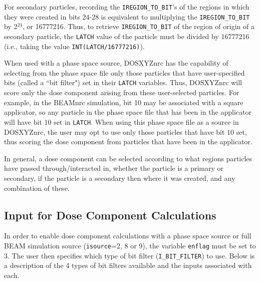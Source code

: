 \documentclass[12pt,twoside]{article}      %
\newcommand{\indexm}[1]{\index{#1}}
\begin{document}
For secondary particles, recording the {\tt IREGION\_TO\_BIT}'s of
the regions in which they were
created in bits 24-28 is equivalent to multiplying the {\tt IREGION\_TO\_BIT} by
2$^{24}$, or 16777216.  Thus, to retrieve {\tt IREGION\_TO\_BIT} of the region
of origin of a
secondary particle, the {\tt LATCH} value of the particle must be divided by
16777216 (i.e., taking the value {\tt INT(LATCH/16777216)}).
\indexm{LATCH}

When used with a phase space source, DOSXYZnrc has the
capability of selecting from the phase space file only those particles that
have user-specified bits (called a ``bit filter") set in their {\tt LATCH}
variables.
Thus, DOSXYZnrc will score only the dose component arising from these user-selected
particles.  For example, in the BEAMnrc simulation, bit 10 may be associated
with a square applicator, so any particle in the phase space file that has
been in the applicator will have bit 10 set in {\tt LATCH}.  When using
this phase space file as a source in DOSXYZnrc, the user may opt to use only
those particles that have bit 10 set, thus scoring the dose component from
particles that have been in the applicator.

In general, a dose component can be selected
according to what regions particles have passed through/interacted in,
whether the particle is a primary or secondary, if the particle is a
secondary then where it was created, and any combination of these.

\subsection{Input for Dose Component Calculations}

In order to enable dose component calculations with a phase space source
or full BEAM simulation source
({\tt isource}=2, 8 or 9),
the variable {\tt enflag} must be set to 3.  The user then specifies which
\indexm{enflag}
type of bit filter ({\tt I\_BIT\_FILTER}) to use.  Below is a description of the
4 types of bit filters available and the inputs associated with each.
\end{document}
